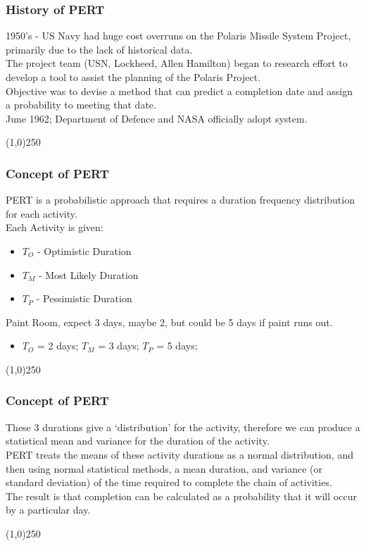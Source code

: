 \begin{frame}
\frametitle{History of PERT}
1950's - US Navy had huge cost overruns on the Polaris Missile System Project, primarily due to the lack of historical data.\\
The project team (USN, Lockheed, Allen Hamilton) began to research effort to develop a tool to assist the planning of the Polaris Project.\\
Objective was to devise a method that can predict a completion date and assign a probability to meeting that date.\\
June 1962; Department of Defence and NASA officially adopt system.\\
\end{frame}
\begin{center}\line(1,0){250}\end{center}



\begin{frame}
\frametitle{Concept of PERT}
PERT is a probabilistic approach that requires a duration frequency distribution for each activity.\\
Each Activity is given:\\
\begin{itemize}
	\item $T_O$ - Optimistic Duration
	\item $T_M$ - Most Likely Duration
	\item $T_P$ - Pessimistic Duration
\end{itemize}
Paint Room, expect 3 days, maybe 2, but could be 5 days if paint runs out.
\begin{itemize}
	\item $T_O$ = 2 days; $T_M$ = 3 days; $T_P$ = 5 days;
\end{itemize}
\end{frame}
\begin{center}\line(1,0){250}\end{center}



\begin{frame}
\frametitle{Concept of PERT}
These 3 durations give a `distribution' for the activity, therefore we can produce a statistical mean and variance for the duration of the activity.\\
PERT treats the means of these activity durations as a normal distribution, and then using normal statistical methods, a mean duration, and variance (or standard deviation) of the time required to complete the chain of activities. \\
The result is that completion can be calculated as a  probability that it will occur by a particular day.\\
\end{frame}
\begin{center}\line(1,0){250}\end{center}



